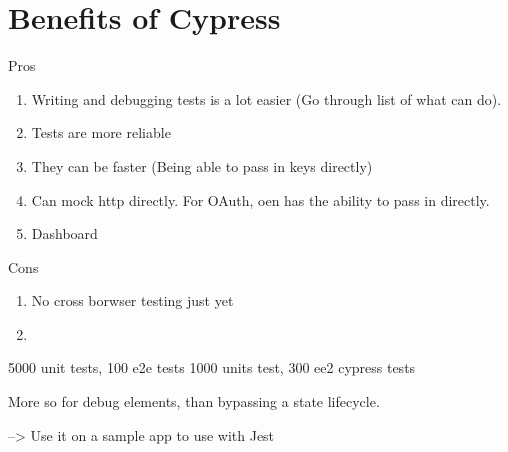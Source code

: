\maketitle{}
\section{ Benefits of Cypress }

Pros
\begin{enumerate}
  \item Writing and debugging tests is a lot easier (Go through list of what
  can do).
  \item Tests are more reliable
  \item They can be faster (Being able to pass in keys directly)
  \item Can mock http directly. For OAuth, oen has the ability to pass in
  directly.
  \item Dashboard
\end{enumerate}

Cons
  \begin{enumerate}
    \item No cross borwser testing just yet
    \item
  \end{enumerate}

  5000 unit tests, 100 e2e tests
  1000 units test, 300 ee2 cypress tests

  More so for debug elements, than bypassing a state lifecycle.

  --> Use it on a sample app to use with Jest
